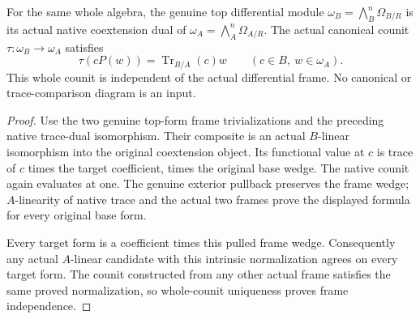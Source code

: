 \begin{theorem}
\label{thm:kn-nadel-canonical-unit-root-counit}
\leanok
{}
For the same whole algebra, the genuine top differential module
$\omega_B=\bigwedge_B^n\Omega_{B/R}$ is its actual native coextension
dual of $\omega_A=\bigwedge_A^n\Omega_{A/R}$.  The actual canonical
counit $\tau:\omega_B\to\omega_A$ satisfies
\[
 \tau(cP(w))=\operatorname{Tr}_{B/A}(c)w
       \qquad(c\in B,\ w\in\omega_A).
\]
This whole counit is independent of the actual differential frame.
No canonical or trace-comparison diagram is an input.
\end{theorem}
\begin{proof}
Use the two genuine top-form frame trivializations and the preceding
native trace-dual isomorphism.  Their composite is an actual
$B$-linear isomorphism into the original coextension object.  Its
functional value at $c$ is trace of $c$ times the target coefficient,
times the original base wedge.  The native counit again evaluates
at one.  The genuine exterior pullback preserves the frame wedge;
$A$-linearity of native trace and the actual two frames prove the
displayed formula for every original base form.

Every target form is a coefficient times this pulled frame wedge.
Consequently any actual $A$-linear candidate with this intrinsic
normalization agrees on every target form.  The counit constructed
from any other actual frame satisfies the same proved normalization,
so whole-counit uniqueness proves frame independence.
\end{proof}

